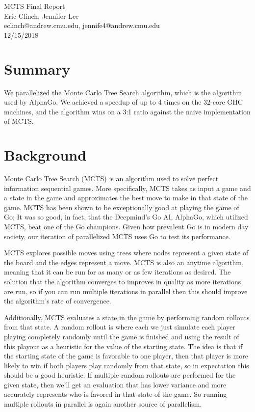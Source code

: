 \documentclass[11pt]{article}
\makeatletter
\newcommand{\myname}{Eric Clinch, Jennifer Lee}
\newcommand{\myandrew}{eclinch@andrew.cmu.edu, jennife4@andrew.cmu.edu}
\makeatother
\begin{document}
\medskip                        %

\thispagestyle{plain}
\begin{center}                  %
{\Large MCTS Final Report} \\
\myname \\
\myandrew \\
12/15/2018 \\
\end{center}

\section*{Summary}
We parallelized the Monte Carlo Tree Search algorithm, which is the algorithm used by AlphaGo. We achieved a speedup of up to 4 times on the 32-core GHC machines, and the algorithm wins on a 3:1 ratio against the naive implementation of MCTS. 

\section*{Background}

Monte Carlo Tree Search (MCTS) is an algorithm used to solve perfect information sequential games. More specifically, MCTS takes as input a game and a state in the game and approximates the best move to make in that state of the game. MCTS has been shown to be exceptionally good at playing the game of Go; It was so good, in fact, that the Deepmind's Go AI, AlphaGo, which utilized MCTS, beat one of the Go champions. Given how prevalent Go is in modern day society, our iteration of parallelized MCTS uses Go to test its performance.

MCTS explores possible moves using trees where nodes represent a given state of the board and the edges represent a move. MCTS is also an anytime algorithm, meaning that it can be run for as many or as few iterations as desired. The solution that the algorithm converges to improves in quality as more iterations are run, so if you can run multiple iterations in parallel then this should improve the algorithm's rate of convergence. %

Additionally, MCTS evaluates a state in the game by performing random rollouts from that state. A random rollout is where each we just simulate each player playing completely randomly until the game is finished and using the result of this playout as a heuristic for the value of the starting state. The idea is that if the starting state of the game is favorable to one player, then that player is more likely to win if both players play randomly from that state, so in expectation this should be a good heuristic. If multiple random rollouts are performed for the given state, then we'll get an evaluation that has lower variance and more accurately represents who is favored in that state of the game. So running multiple rollouts in parallel is again another source of parallelism.
\end{document}
